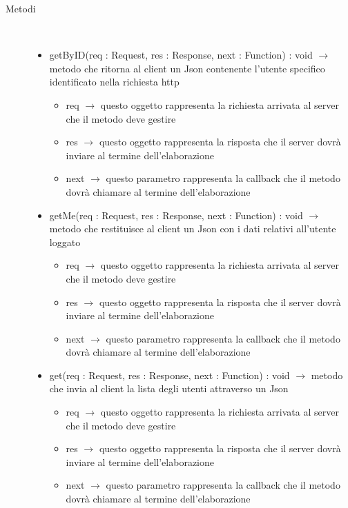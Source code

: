 \begin{description}
\item[Metodi] \hfill \\
\vspace{-7mm}
\begin{itemize}
	\item getByID(req : Request, res : Response, next : Function) : void $\rightarrow$ metodo che ritorna al client un Json contenente l'utente specifico identificato nella richiesta http\begin{itemize}
		\item req $\rightarrow$ questo oggetto rappresenta la richiesta arrivata al server che il metodo deve gestire
		\item res $\rightarrow$ questo oggetto rappresenta la risposta che il server dovrà inviare al termine dell'elaborazione
		\item next $\rightarrow$ questo parametro rappresenta la callback che il metodo dovrà chiamare al termine dell’elaborazione
	\end{itemize}
	
	\item getMe(req : Request, res : Response, next : Function) : void $\rightarrow$ metodo che restituisce al client un Json con i dati relativi all'utente loggato\begin{itemize}
		\item req $\rightarrow$ questo oggetto rappresenta la richiesta arrivata al server che il metodo deve gestire
		\item res $\rightarrow$ questo oggetto rappresenta la risposta che il server dovrà inviare al termine dell'elaborazione
		\item next $\rightarrow$ questo parametro rappresenta la callback che il metodo dovrà chiamare al termine dell’elaborazione
	\end{itemize}
	
	\item get(req : Request, res : Response, next : Function) : void $\rightarrow$ metodo che invia al client la lista degli utenti attraverso un Json\begin{itemize}
		\item req $\rightarrow$ questo oggetto rappresenta la richiesta arrivata al server che il metodo deve gestire
		\item res $\rightarrow$ questo oggetto rappresenta la risposta che il server dovrà inviare al termine dell'elaborazione
		\item next $\rightarrow$ questo parametro rappresenta la callback che il metodo dovrà chiamare al termine dell’elaborazione
	\end{itemize}
	

\end{itemize}
\end{description}
